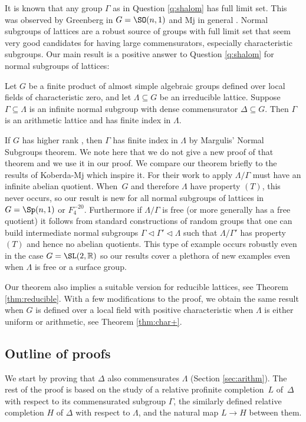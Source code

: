 It is known that any group $\Gamma$ as in Question \ref{q:shalom} has full limit set. This was observed by Greenberg in $G=\SO(n,1)$ and Mj in general \cite{greenberg-comm, mj-comm}. Normal subgroups of lattices are a robust source of groups with full limit set that seem very good candidates for having large commensurators, especially characteristic subgroups. Our main result is a positive answer to Question \ref{q:shalom} for normal subgroups of lattices:

\begin{thm}\label{thm:main}
Let $G$ be a finite product of almost simple algebraic groups defined over local fields of characteristic zero, and let $\Lambda\subseteq G$ be an irreducible lattice. Suppose $\Gamma\subseteq \Lambda$ is an infinite normal subgroup with dense commensurator $\Delta\subseteq G$. Then $\Gamma$ is an arithmetic lattice and has finite index in $\Lambda$.
\end{thm}

If $G$ has higher rank , then $\Gamma$ has finite index in $\Lambda$ by Margulis' Normal Subgroups theorem. We note here that we do not give a new proof of that theorem and we use it in our proof. We compare our theorem briefly to the results of Koberda-Mj which inspire it. For their work to apply $\Lambda/\Gamma$ must have
an infinite abelian quotient. When~$G$ and therefore $\Lambda$ have property $(T)$, this never occurs, so our result is new for all normal subgroups of lattices in $G=\Sp(n,1)$ or $F_4^{-20}$. Furthermore if $\Lambda/\Gamma$ is free (or more generally has a free quotient) it follows from standard constructions of random groups that one can build intermediate normal subgroups $\Gamma \lhd \Gamma' \lhd \Lambda$ such that $\Lambda/\Gamma'$ has property $(T)$ and hence no abelian quotients. This type of example occurs robustly even in the case $G=\SL(2, \mathbb{R})$ so our results cover a plethora of new examples even when $\Lambda$ is free or a surface group.

Our theorem also implies a suitable version for reducible lattices, see Theorem \ref{thm:reducible}. With a few modifications to the proof, we obtain the same result when $G$ is defined over a local field with positive characteristic when $\Lambda$ is either uniform or arithmetic, see Theorem \ref{thm:char+}.

\subsection{Outline of proofs}\label{sec:outline}
We start by proving that $\Delta$ also commensurates $\Lambda$ (Section \ref{sec:arithm}). The rest of the proof is based on the study of a relative profinite completion~$L$ of~$\Delta$ with respect to its commensurated subgroup $\Gamma$, the similarly defined relative completion $H$ of $\Delta$ with respect to $\Lambda$, and the natural map $L\to H$ between them.

